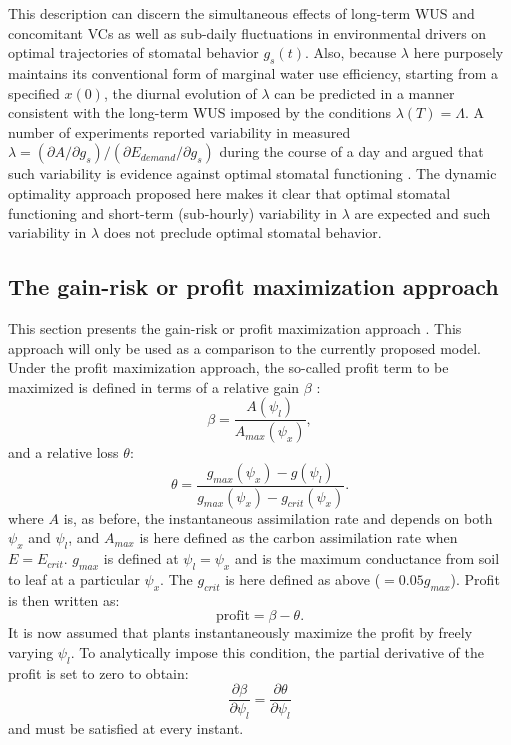 \documentclass[utf8]{frontiersSCNS} %
\begin{document}
This description can discern the simultaneous effects of long-term WUS and concomitant VCs as well as sub-daily fluctuations in environmental drivers on optimal trajectories of stomatal behavior $g_s(t)$.  Also, because $\lambda$ here purposely maintains its conventional form of marginal water use efficiency, starting from a specified $x(0)$, the diurnal evolution of $\lambda$ can be predicted in a manner consistent with the long-term WUS imposed by the conditions $\lambda(T)=\Lambda$.  A number of experiments reported variability in measured $\lambda=(\partial A/\partial g_s)/(\partial E_{demand}/\partial g_s)$ during the course of a day and argued that such variability is evidence against optimal stomatal functioning \citep{fites1988co2}.  The dynamic optimality approach proposed here makes it clear that optimal stomatal functioning and short-term (sub-hourly) variability in $\lambda$ are expected and such variability in $\lambda$ does not preclude optimal stomatal behavior.

\subsection{The gain-risk or profit maximization approach}

This section presents the gain-risk or profit maximization approach \citep{sperry_what_2015, sperry_pragmatic_2016}. This approach will only be used as a comparison to the currently proposed model. Under the profit maximization approach, the so-called profit term to be maximized is defined in terms of a relative gain $\beta$ \citep{sperry_predicting_2017}:
\begin{equation}
    \beta = \frac{A(\psi_l)}{A_{max}(\psi_x)},
    \label{eqn:rel_gain}
\end{equation}
and a relative loss $\theta$:
\begin{equation}
    \theta = \frac{g_{max}(\psi_x) - g(\psi_l)}{g_{max}(\psi_x) - g_{crit}(\psi_x)}.
    \label{eqn:rel_loss}
\end{equation}
where $A$ is, as before, the instantaneous assimilation rate and depends on both $\psi_x$ and $\psi_l$, and $A_{max}$ is here defined as the carbon assimilation rate when $E = E_{crit}$. $g_{max}$ is defined at $\psi_l = \psi_x$ and is the maximum conductance from soil to leaf at a particular $\psi_x$. The $g_{crit}$ is here defined as above ($= 0.05 g_{max}$). Profit is then written as:
\begin{equation}
    \text{profit} = \beta - \theta.
    \label{eqn:profit}
\end{equation}
It is now assumed that plants instantaneously maximize the profit by freely varying $\psi_l$. To analytically impose this condition, the partial derivative of the profit is set to zero to obtain:
\begin{equation}
    \frac{\partial \beta}{\partial \psi_l} = \frac{\partial \theta}{\partial \psi_l}
\end{equation}
and must be satisfied at every instant.
\end{document}
